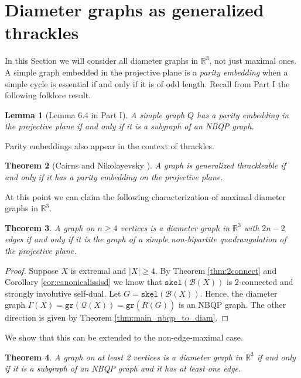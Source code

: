 \documentclass[10pt,a4paper]{article}
\newtheorem{theorem}{Theorem}[section]
\newtheorem{lemma}[theorem]{Lemma}
\newcommand{\R}[0]{\mathbb{R}}
\newcommand{\Bc}[0]{\mathcal{B}}
\newcommand{\skel}[0]{\mathtt{skel}}
\newcommand{\qt}{\mathcal{Q}}
\newcommand{\gr}{\mathtt{gr}}
\begin{document}
\section{Diameter graphs as generalized thrackles}\label{sec:thrackles}

In this Section we will consider all diameter graphs in $\R^3$, not just maximal ones.  A simple graph embedded in the projective plane is a \emph{parity embedding} when a simple cycle is essential if and only if it is of odd length. Recall from Part I the following folklore result.


\begin{lemma}[Lemma 6.4 in Part I]\label{lem:eqmaxcases}
    A simple graph $Q$ has a parity embedding in the projective plane if and only if it is a subgraph of an NBQP graph.
     




\end{lemma} 


Parity embeddings also appear in the context of thrackles. 

\begin{theorem}[Cairns and Nikolayevsky  \cite{CN00}]\label{thm:thrpairtyemb}
    A graph is generalized thrackleable if and only if it has a parity embedding on the projective plane.
\end{theorem}




At this point we can claim the following characterization of maximal diameter graphs in $\R^3$.

\begin{theorem}
A graph on $n\ge4$ vertices is a diameter graph in $\R^3$ with $2n-2$ edges if and only if it is the graph of a simple non-bipartite quadrangulation of the projective plane.    
\end{theorem}
\begin{proof}
    Suppose $X$ is extremal and $|X|\ge 4$. By Theorem \ref{thm:2connect} and Corollary \ref{cor:canonicalissisd} we know that $\skel(\Bc(X))$ is 2-connected and strongly involutive self-dual. Let $G=\skel(\Bc(X))$. Hence, the diameter graph $\Gamma(X)=\gr(\qt(X))=\gr(\overline{R}(G))$ is an NBQP graph. The other direction is given by Theorem \ref{thm:main_nbqp_to_diam}.
 
\end{proof}
 
We show that this can be extended to the non-edge-maximal case. 

\begin{theorem}
    A graph on at least 2 vertices is a diameter graph in $\R^3$ if and only if it is a subgraph of an NBQP graph and it has at least one edge. 
\end{theorem}
\end{document}
